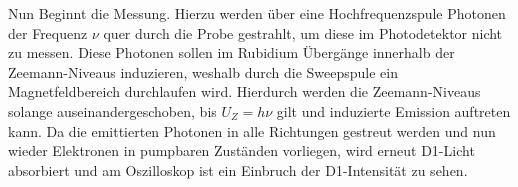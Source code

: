 Nun Beginnt die Messung. Hierzu werden über eine Hochfrequenzspule Photonen der Frequenz $\nu$ quer durch die Probe gestrahlt, um diese im Photodetektor nicht zu messen. Diese Photonen sollen im Rubidium Übergänge innerhalb der Zeemann-Niveaus induzieren, weshalb durch die Sweepspule ein Magnetfeldbereich durchlaufen wird. Hierdurch werden die Zeemann-Niveaus solange auseinandergeschoben, bis $U_Z=h\nu$ gilt und induzierte Emission auftreten kann. Da die emittierten Photonen in alle Richtungen gestreut werden und nun wieder Elektronen in pumpbaren Zuständen vorliegen, wird erneut D1-Licht absorbiert und am Oszilloskop ist ein Einbruch der D1-Intensität zu sehen.
